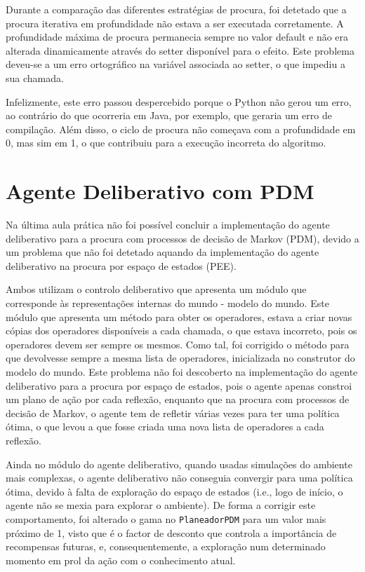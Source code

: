 Durante a comparação das diferentes estratégias de procura, foi detetado que a procura iterativa em profundidade não estava a ser executada corretamente. A profundidade máxima de procura permanecia sempre no valor default e não era alterada dinamicamente através do setter disponível para o efeito. Este problema deveu-se a um erro ortográfico na variável associada ao setter, o que impediu a sua chamada.

Infelizmente, este erro passou despercebido porque o Python não gerou um erro, ao contrário do que ocorreria em Java, por exemplo, que geraria um erro de compilação.
Além disso, o ciclo de procura não começava com a profundidade em 0, mas sim em 1, o que contribuiu para a execução incorreta do algoritmo.

\section{Agente Deliberativo com PDM}\label{sec:agente-deliberativo-com-pdm}

Na última aula prática não foi possível concluir a implementação do agente deliberativo para a procura com processos de decisão de Markov (PDM), devido a um problema que não foi detetado aquando da implementação do agente deliberativo na procura por espaço de estados (PEE).

Ambos utilizam o controlo deliberativo que apresenta um módulo que corresponde às representações internas do mundo - modelo do mundo.
Este módulo que apresenta um método para obter os operadores, estava a criar novas cópias dos operadores disponíveis a cada chamada, o que estava incorreto, pois os operadores devem ser sempre os mesmos.
Como tal, foi corrigido o método para que devolvesse sempre a mesma lista de operadores, inicializada no construtor do modelo do mundo.
Este problema não foi descoberto na implementação do agente deliberativo para a procura por espaço de estados, pois o agente apenas constroi um plano de ação por cada reflexão, enquanto que na procura com processos de decisão de Markov, o agente tem de refletir várias vezes para ter uma política ótima, o que levou a que fosse criada uma nova lista de operadores a cada reflexão.

Ainda no módulo do agente deliberativo, quando usadas simulações do ambiente mais complexas, o agente deliberativo não conseguia convergir para uma política ótima, devido à falta de exploração do espaço de estados (i.e., logo de início, o agente não se mexia para explorar o ambiente).
De forma a corrigir este comportamento, foi alterado o gama no \texttt{PlaneadorPDM} para um valor mais próximo de 1, visto que é o factor de desconto que controla a importância de recompensas futuras, e, consequentemente, a exploração num determinado momento em prol da ação com o conhecimento atual.


